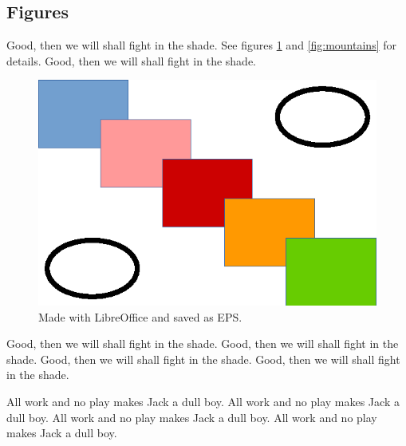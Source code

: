 
%
%

%
%

\subsection{Figures}
\label{sec:discussion_figures}

Good, then we will shall fight in the shade.
See figures
\ref{fig:shapes} and
\ref{fig:mountains} for details.
Good, then we will shall fight in the shade.

\begin{figure}[h]
\centering
\includegraphics{../figures/shapes.eps}
\caption{Made with LibreOffice and saved as EPS.}
\label{fig:shapes}
\end{figure}

Good, then we will shall fight in the shade.
Good, then we will shall fight in the shade.
Good, then we will shall fight in the shade.
Good, then we will shall fight in the shade.

All work and no play makes Jack a dull boy.
All work and no play makes Jack a dull boy.
All work and no play makes Jack a dull boy.
All work and no play makes Jack a dull boy.

